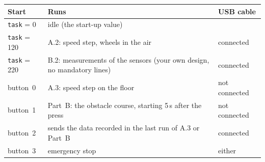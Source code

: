 \documentclass[11pt,a4paper]{article}
\begin{document}
\smallskip\noindent
\begin{tabularx}{\textwidth}{@{}l L l@{}}
\toprule
Start & Runs & USB cable \\
\midrule
\texttt{task} = 0   & idle (the start-up value) & \\
\texttt{task} = 120 & A.2: speed step, wheels in the air & connected \\
\texttt{task} = 220 & B.2: measurements of the sensors (your own design, no mandatory lines) & connected \\
button~0 & A.3: speed step on the floor & not connected \\
button~1 & Part~B: the obstacle course, starting 5\,s after the press & not connected \\
button~2 & sends the data recorded in the last run of A.3 or Part~B & connected \\
button~3 & emergency stop & either \\
\bottomrule
\end{tabularx}
\end{document}
